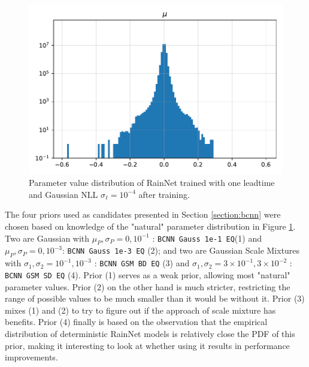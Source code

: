 \begin{figure}
	\centering
	\includegraphics[width=\linewidth]{images/weight/bcnn_rn_t1_lt5}
	\caption{Parameter value distribution of RainNet trained with one leadtime and Gaussian NLL $\sigma_\ell = 10^{-4}$ after training.}
	\label{fig:rn-weight}
\end{figure}


The four priors used as candidates presented in Section \ref{section:bcnn} were chosen based on knowledge of the "natural" parameter distribution in Figure \ref{fig:rn-weight}. Two are Gaussian with $\mu_P, \sigma_P = 0,10^{-1}$ : \texttt{BCNN Gauss 1e-1 EQ}(1) and $\mu_P, \sigma_P = 0,10^{-3}$: \texttt{BCNN Gauss 1e-3 EQ} (2); and two are Gaussian Scale Mixtures with $\sigma_1,\sigma_2 = 10^{-1}, 10^{-3}$ : \texttt{BCNN GSM BD EQ} (3) and $\sigma_1,\sigma_2 = 3 \times 10^{-1}, 3 \times 10^{-2}$ : \texttt{BCNN GSM SD EQ} (4). 
Prior (1) serves as a weak prior, allowing most "natural" parameter values. Prior (2) on the other hand is much stricter, restricting the range of possible values to be much smaller than it would be without it. Prior (3) mixes (1) and (2) to try to figure out if the approach of scale mixture has benefits. Prior (4) finally is based on the observation that the empirical distribution of deterministic RainNet models is relatively close the PDF of this prior, making it interesting to look at whether using it results in performance improvements.

